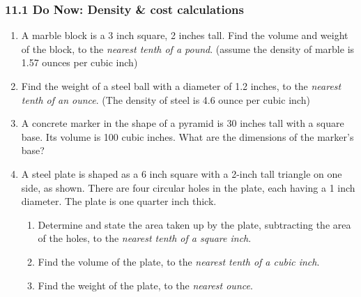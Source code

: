 \documentclass[12pt, twoside]{article}
\begin{document}
\subsubsection*{11.1 Do Now: Density \& cost calculations}
 \begin{enumerate}

   \item A marble block is a 3 inch square, 2 inches tall. Find the volume and weight of the block, to the \emph{nearest tenth of a pound}. (assume the density of marble is 1.57 ounces per cubic inch) \vspace{5cm}

  \item Find the weight of a steel ball with a diameter of 1.2 inches, to the \emph{nearest tenth of an ounce}. (The density of steel is 4.6 ounce per cubic inch)  \vspace{7cm}

  \item A concrete marker in the shape of a pyramid is 30 inches tall with a square base. Its volume is 100 cubic inches. What are the dimensions of the marker's base? \vspace{3.5cm}

\newpage

  \item A steel plate is shaped as a 6 inch square with a 2-inch tall triangle on one side, as shown. There are four circular holes in the plate, each having a 1 inch diameter. The plate is one quarter inch thick.
  \begin{enumerate}
    \item Determine and state the area taken up by the plate, subtracting the area of the holes, to the \emph{nearest tenth of a square inch}.\\[1.5cm]
       \vspace{1cm}
    \item Find the volume of the plate, to the \emph{nearest tenth of a cubic inch}. \vspace{2cm}
    \item Find the weight of the plate, to the \emph{nearest ounce}.
  \end{enumerate} \vspace{1.5cm}


\end{enumerate}
\end{document}
